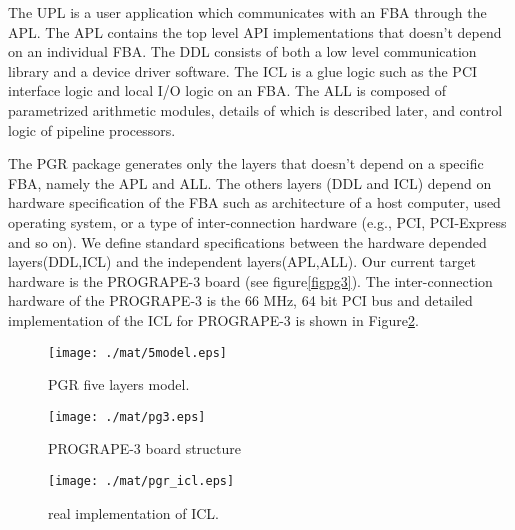 \documentclass{llncs}
\begin{document}
The UPL is a user application which communicates
with an FBA through the APL.
The APL contains the top level API implementations that
doesn't depend on an individual FBA.
The DDL consists of both a low level communication library and a device driver software. 
The ICL is a glue logic such as the PCI interface logic and 
local I/O logic on an FBA.
The ALL is composed of parametrized arithmetic modules,
details of which is described later, 
and control logic of pipeline processors.

The PGR package generates only the layers that doesn't depend on 
a specific FBA, namely the APL and ALL.
The others layers (DDL and ICL) depend on hardware specification
of the FBA such as architecture of a host computer, used operating
system, or a type of inter-connection hardware (e.g., PCI, PCI-Express and so on).
We define standard specifications between the hardware depended layers(DDL,ICL)
and the independent layers(APL,ALL).
Our current target hardware is the PROGRAPE-3 board (see figure\ref{figpg3}).
The inter-connection hardware of the PROGRAPE-3 is the 66 MHz, 64 bit PCI bus
and detailed implementation of the ICL for PROGRAPE-3
is shown in Figure\ref{figicl}.

\begin{figure}[htb]
\begin{center}
  \begin{minipage}{.45\linewidth}
    \begin{center}
    \texttt{[image: ./mat/5model.eps]}
    \caption{PGR five layers model.}
    \label{fig5model}
    \end{center}
  \end{minipage}
  \hspace{2.4pc}
  \begin{minipage}{.45\linewidth}
    \begin{center}
    \texttt{[image: ./mat/pg3.eps]}
    \caption{PROGRAPE-3 board structure}
    \end{center}
  \end{minipage}
\end{center}
\end{figure}



\begin{figure}[htb]
\begin{center}
\texttt{[image: ./mat/pgr\_icl.eps]}
\caption{real implementation of ICL.}
\label{figicl}
\end{center}
\end{figure}
\end{document}

